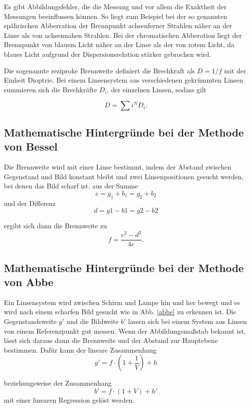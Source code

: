 Es gibt Abbildungsfehler, die die Messung und vor allem die Exaktheit der Messungen beeinflussen können. So liegt zum Beispiel bei der so genannten spährischen Abberration der Brennpunkt achsenferner Strahlen näher an der Linse als von achsennahen Strahlen. Bei der chromatischen Abberation liegt der Brennpunkt von blauem Licht näher an der Linse als der von rotem Licht, da blaues Licht aufgrund der Dispersionsrelation stärker gebrochen wird.  

Die sogenannte reziproke Brennweite definiert die Brechkraft als $D= 1/f$ mit der Einheit Dioptrie. Bei einem Linsensystem aus verschiedenen gekrümmten Linsen summieren sich die Brechkräfte $D_i$, der einzelnen Linsen, sodass gilt 

\begin{equation}
    D= \sum{i}^N D_i.
    \label{eqn:brechungskraft}
\end{equation}

\subsection{Mathematische Hintergründe bei der Methode von Bessel}

Die Brennweite wird mit einer Linse bestimmt, indem der Abstand zwischen Gegenstand und Bild konstant bleibt und zwei Linsenpositionen gesucht werden, bei denen das Bild scharf ist. aus der Summe 
\begin{equation}
    e = g_1 + b_1 = g_2 + b_2
    \label{eqn:e}
\end{equation}
und der Differenz 
\begin{equation}
    d = g1- b1 = g2 - b2
    \label{eqn:d}
\end{equation}

ergibt sich dann die Brennweite zu
\begin{equation}
    f = \frac{e^2 - d^2}{4 e}.
    \label{eqn:fBessel}
\end{equation} 

\subsection{Mathematische Hintergründe bei der Methode von Abbe}
Ein Linsensystem wird zwischen Schirm und Lampe hin und her bewegt und es wird nach einem scharfen Bild gesucht wie in Abb. \ref{abbe} zu erkennen ist.
Die Gegenstandsweite $g'$ und die Bildweite $b'$ lassen sich bei einem System aus Linsen von einem Referenzpunkt gut messen. 
Wenn der Abbildungsmaßstab bekannt ist, lässt sich daraus dann die Brennweite und der Abstand zur Hauptebene bestimmen. 
Dafür kann der lineare Zusammenhang 
\begin{equation}
    g' = f \cdot \left(1 + \frac{1}{V} \right) + h
    \label{eqn:gstrich}
\end{equation}

beziehungsweise der Zusammenhang 
\begin{equation}
    b' = f \cdot \left(1 + V \right) + h'
    \label{eqn:gstrich}
\end{equation}
mit einer linearen Regression gelöst werden. 
